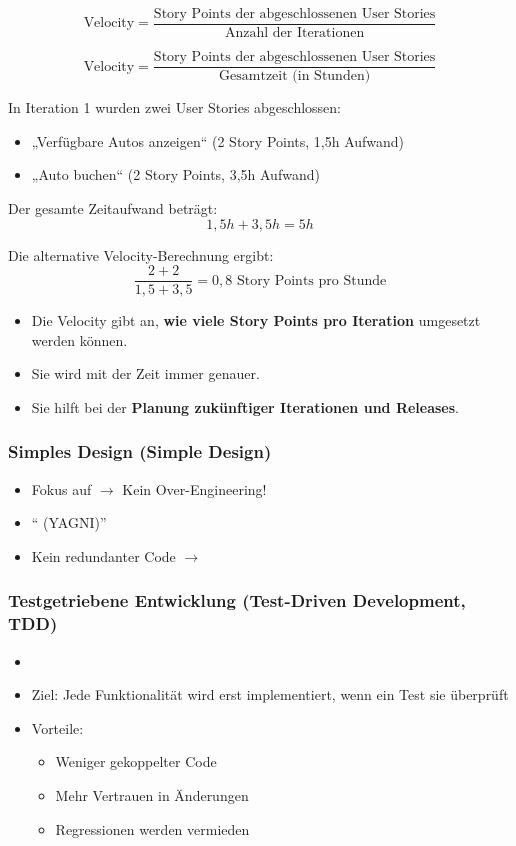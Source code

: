 \[
\text{Velocity} = \frac{\text{Story Points der abgeschlossenen User Stories}}{\text{Anzahl der Iterationen}}
\]

\[
\text{Velocity} = \frac{\text{Story Points der abgeschlossenen User Stories}}{\text{Gesamtzeit (in Stunden)}}
\]

In Iteration 1 wurden zwei User Stories abgeschlossen:
\begin{itemize}
    \item „Verfügbare Autos anzeigen“ (2 Story Points, 1,5h Aufwand)
    \item „Auto buchen“ (2 Story Points, 3,5h Aufwand)
\end{itemize}

Der gesamte Zeitaufwand beträgt:
\[
1,5h + 3,5h = 5h
\]

Die alternative Velocity-Berechnung ergibt:
\[
\frac{2 + 2}{1,5 + 3,5} = 0,8 \text{ Story Points pro Stunde}
\]

\begin{itemize}
    \item Die Velocity gibt an, \textbf{wie viele Story Points pro Iteration} umgesetzt werden können.
    \item Sie wird mit der Zeit immer genauer.
    \item Sie hilft bei der \textbf{Planung zukünftiger Iterationen und Releases}.
\end{itemize}
\subsubsection*{Simples Design (Simple Design)}
\begin{itemize}
    \item Fokus auf  $\rightarrow$ Kein Over-Engineering!
    \item \enquote{ (YAGNI)}
    \item Kein redundanter Code $\rightarrow$ 
\end{itemize}
\subsubsection*{Testgetriebene Entwicklung (Test-Driven Development, TDD)}
\begin{itemize}
    \item {}
    \item Ziel: Jede Funktionalität wird erst implementiert, wenn ein Test sie überprüft
    \item Vorteile:
    \begin{itemize}
        \item Weniger gekoppelter Code
        \item Mehr Vertrauen in Änderungen
        \item Regressionen werden vermieden
    \end{itemize}
\end{itemize}

